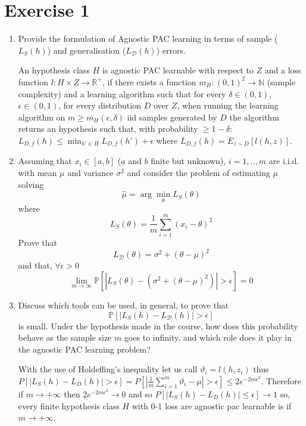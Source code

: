 \documentclass[a4paper,11pt,oneside]{book}
\begin{document}
\section{Exercise 1}
\begin{enumerate}
    \item Provide the formulation of Agnostic PAC learning in terms of sample ($L_S(h)$) and generalisation ($L_\mathcal{D}(h)$) errors.
        \begin{solution}
            An hypothesis class $H$ is agnostic PAC learnable with respect to $Z$ and a loss function $l: H\times Z \to \mathbb{R}^+$, if there exists a function $m_H: (0,1)^2 \to \mathbb{N}$ (sample complexity) and a learning algorithm such that for every $\delta \in (0,1)$, $\epsilon \in (0,1)$, for every distribution $D$ over $Z$, when running the learning algorithm on $m \geq m_H(\epsilon,\delta)$ iid samples generated by $D$ the algorithm returns an hypothesis such that, with probability $\geq 1-\delta$: $L_{D,f}(h) \leq \min_{h'\in H} L_{D,f}(h') + \epsilon$ where $L_{D,f}(h) = E_{z\sim D}[l(h,z)]$.
        \end{solution}
    \item Assuming that $x_i \in [a,b]$ ($a$ and $b$ finite but unknown), $i = 1,..,m$ are i.i.d. with mean $\mu$ and variance $\sigma^2$ and consider the problem of estimating $\mu$ solving
        $$\hat{\mu} = \arg\min_\theta L_S(\theta)$$
        where
        $$L_S(\theta) = \frac{1}{m}\sum_{i=1}^m(x_i - \theta)^2$$
        Prove that
        $$L_\mathcal{D}(\theta) = \sigma^2 + (\theta - \mu)^2$$
        and that, $\forall \epsilon > 0$
        $$\lim_{m\to\infty}\mathbb{P}[|L_S(\theta) - (\sigma^2 + (\theta - \mu)^2)| > \epsilon] = 0$$
    \item Discuss which tools can be used, in general, to prove that
        $$\mathbb{P}[|L_S(h) - L_\mathcal{D}(h)| > \epsilon]$$
        is small. Under the hypothesis made in the course, how does this probability behave as the sample size $m$ goes to infinity, and which role does it play in the agnostic PAC learning problem?
            \begin{solution}
                With the use of Holdeffing's inequality let us call $\vartheta_i = l(h,z_i)$ thus $P[|L_S(h) - L_D(h)| > \epsilon] = P[|\frac{1}{m}\sum_{i=1}^m \vartheta_i - \mu| > \epsilon] \leq 2e^{-2m\epsilon^2}$. Therefore if $m \to +\infty$ then $2e^{-2m\epsilon^2} \to 0$ and so $P[|L_S(h) - L_D(h)| \leq \epsilon] \to 1$ so, every finite hypothesis class $H$ with 0-1 loss are agnostic pac learnable is if $m \to +\infty$.
            \end{solution}
\end{enumerate}
\end{document}
